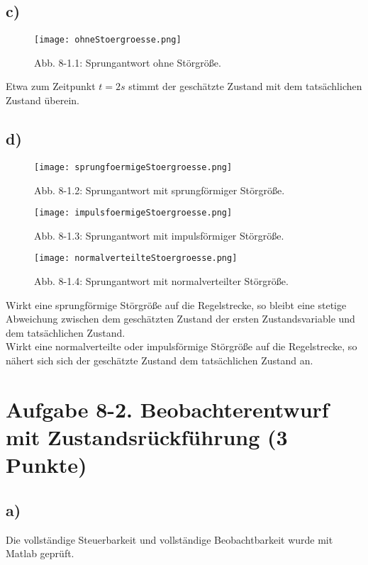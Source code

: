 \documentclass[11pt]{scrartcl} %
\begin{document}
\subsection*{c)}
\begin{figure}[H]
\centering
\texttt{[image: ohneStoergroesse.png]}
\captionsetup{labelformat=empty}
\caption{Abb. 8-1.1: Sprungantwort ohne Störgröße.}
\end{figure}
Etwa zum Zeitpunkt $t=2s$ stimmt der geschätzte Zustand mit dem tatsächlichen Zustand überein.

\subsection*{d)}
\begin{figure}[H]
\centering
\texttt{[image: sprungfoermigeStoergroesse.png]}
\captionsetup{labelformat=empty}
\caption{Abb. 8-1.2: Sprungantwort mit sprungförmiger Störgröße.}
\end{figure}

\begin{figure}[H]
\centering
\texttt{[image: impulsfoermigeStoergroesse.png]}
\captionsetup{labelformat=empty}
\caption{Abb. 8-1.3: Sprungantwort mit impulsförmiger Störgröße.}
\end{figure}

\begin{figure}[H]
\centering
\texttt{[image: normalverteilteStoergroesse.png]}
\captionsetup{labelformat=empty}
\caption{Abb. 8-1.4: Sprungantwort mit normalverteilter Störgröße.}
\end{figure}

Wirkt eine sprungförmige Störgröße auf die Regelstrecke, so bleibt eine stetige Abweichung zwischen dem geschätzten Zustand der ersten Zustandsvariable und dem tatsächlichen Zustand.\\
Wirkt eine normalverteilte oder impulsförmige Störgröße auf die Regelstrecke, so nähert sich sich der geschätzte Zustand dem tatsächlichen Zustand an.


\section*{Aufgabe 8-2. Beobachterentwurf mit Zustandsrückführung (3 Punkte)}
\subsection*{a)}
Die vollständige Steuerbarkeit und vollständige Beobachtbarkeit wurde mit Matlab geprüft.
\end{document}
